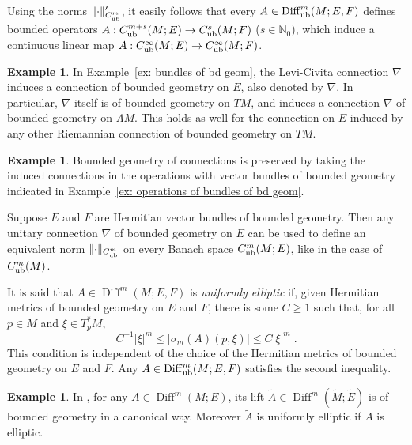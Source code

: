 \documentclass{memo-l}
\theoremstyle{plain}
\theoremstyle{definition}
\newtheorem{ex}[thm]{Example}
\theoremstyle{remark}
\newcommand{\N}{\mathbb{N}}
\newcommand{\Diff}{\operatorname{Diff}}
\newcommand{\Diffub}{\Diff_{\text{\rm ub}}}
\newcommand{\Cinftyub}{C^\infty_{\text{\rm ub}}}
\numberwithin{section}{chapter}
\numberwithin{equation}{section}%
\begin{document}
Using the norms $\|{\cdot}\|'_{C^m_{\text{\rm ub}}}$, it easily follows that every $A\in\Diffub^m(M;E,F)$ defines bounded operators $A:C^{m+s}_{\text{\rm ub}}(M;E)\to C^s_{\text{\rm ub}}(M;F)$ ($s\in\N_0$), which induce a continuous linear map $A:\Cinftyub(M;E)\to \Cinftyub(M;F)$.

\begin{ex}\label{ex: connections of bd geom}
In Example~\ref{ex: bundles of bd geom}, the Levi-Civita connection $\nabla$ induces a connection of bounded geometry on $E$, also denoted by $\nabla$. In particular, $\nabla$ itself is of bounded geometry on $TM$, and induces a connection $\nabla$ of bounded geometry on $\Lambda M$. This holds as well for the connection on $E$ induced by any other Riemannian connection of bounded geometry on $TM$. 
\end{ex}

\begin{ex}\label{ex: connections induced by natural operations} Bounded geometry of connections is preserved by taking the induced connections in the operations with vector bundles of bounded geometry indicated in Example~\ref{ex: operations of bundles of bd geom}. 
\end{ex}

Suppose $E$ and $F$ are Hermitian vector bundles of bounded geometry. Then any unitary connection $\nabla$ of bounded geometry on $E$ can be used to define an equivalent norm $\|{\cdot}\|_{C^m_{\text{\rm ub}}}$ on every Banach space $C_{\text{\rm ub}}^m(M;E)$, like in the case of $C_{\text{\rm ub}}^m(M)$. 

It is said that $A\in\Diff^m(M;E,F)$ is \emph{uniformly elliptic}  if, given Hermitian metrics of bounded geometry on $E$ and $F$, there is some $C\ge1$ such that, for all $p\in M$ and $\xi\in T^*_pM$,
\begin{equation}\label{uniformly elliptic}
C^{-1}|\xi|^m\le|\sigma_m(A)(p,\xi)|\le C|\xi|^m\;.
\end{equation}
This condition is independent of the choice of the Hermitian metrics of bounded geometry on $E$ and $F$. Any $A\in\Diff^m_{\text{\rm ub}}(M;E,F)$ satisfies the second inequality. 

\begin{ex}\label{ex: widetilde A}
In , for any $A\in\Diff^m(M;E)$, its lift $\widetilde A\in\Diff^m(\widetilde M;\widetilde E)$ is of bounded geometry in a canonical way. Moreover $\widetilde A$ is uniformly elliptic if $A$ is elliptic.
\end{ex}
\end{document}
